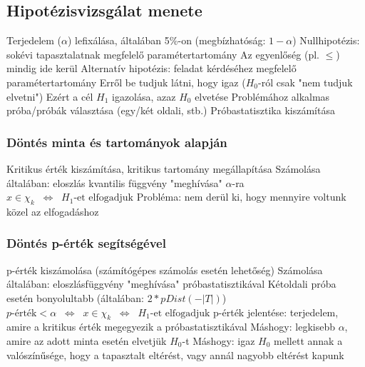 \documentclass[12pt,a4paper]{article}
\begin{document}
\pagebreak

\subsection{Hipotézisvizsgálat menete}

\begin{outline}
	\1 Terjedelem ($\alpha$) lefixálása, általában 5\%-on (megbízhatóság: $1 - \alpha$)
	\1 Nullhipotézis: sokévi tapasztalatnak megfelelő paramétertartomány
		\2 Az egyenlőség (pl. $\le$) mindig ide kerül
	\1 Alternatív hipotézis: feladat kérdéséhez megfelelő paramétertartomány
		\2 Erről be tudjuk látni, hogy igaz ($H_0$-ról csak "nem tudjuk elvetni")
		\2 Ezért a cél $H_1$ igazolása, azaz $H_0$ elvetése
	\1 Problémához alkalmas próba/próbák választása (egy/két oldali, stb.)
	\1 Próbastatisztika kiszámítása
\end{outline}

\subsubsection{Döntés minta és tartományok alapján}

\begin{outline}
	\1 Kritikus érték kiszámítása, kritikus tartomány megállapítása
		\2 Számolása általában: eloszlás kvantilis függvény "meghívása" $\alpha$-ra
	\1 $x \in \chi_k \;\;\Leftrightarrow\;\; H_1\text{-et elfogadjuk}$
	\1 Probléma: nem derül ki, hogy mennyire voltunk közel az elfogadáshoz
\end{outline}

\subsubsection{Döntés p-érték segítségével}

\begin{outline}
	\1 p-érték kiszámolása (számítógépes számolás esetén lehetőség)
		\2 Számolása általában: eloszlásfüggvény "meghívása" próbastatisztikával
		\2 Kétoldali próba esetén bonyolultabb (általában: $2*pDist(-|T|)$)
	\1 $p\text{-érték} < \alpha \;\;\Leftrightarrow\;\; x \in \chi_k
	\;\;\Leftrightarrow\;\; H_1\text{-et elfogadjuk}$
	\1 p-érték jelentése: terjedelem, amire a kritikus érték megegyezik a próbastatisztikával
		\2 Máshogy: legkisebb $\alpha$, amire az adott minta esetén elvetjük $H_0$-t
		\2 Máshogy: igaz $H_0$ mellett annak a valószínűsége, hogy a tapasztalt eltérést, vagy annál nagyobb eltérést kapunk
\end{outline}
\end{document}
